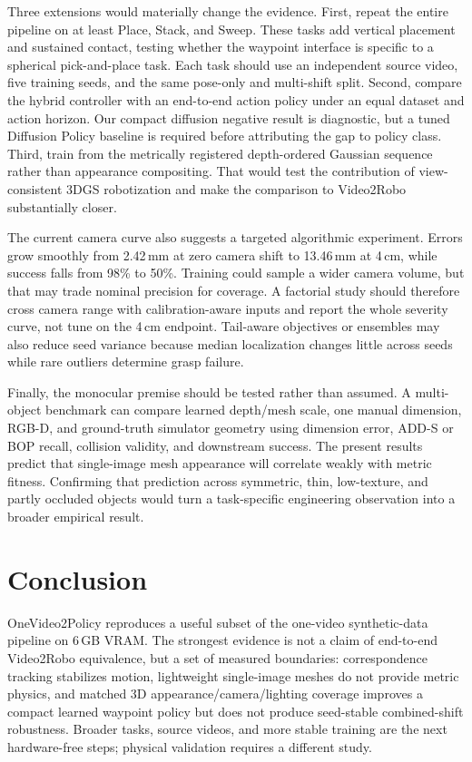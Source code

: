 \documentclass[10pt,twocolumn,letterpaper]{article}
\begin{document}
Three extensions would materially change the evidence. First, repeat the entire
pipeline on at least Place, Stack, and Sweep. These tasks add vertical placement
and sustained contact, testing whether the waypoint interface is specific to a
spherical pick-and-place task. Each task should use an independent source video,
five training seeds, and the same pose-only and multi-shift split. Second, compare
the hybrid controller with an end-to-end action policy under an equal dataset and
action horizon. Our compact diffusion negative result is diagnostic, but a tuned
Diffusion Policy baseline is required before attributing the gap to policy class.
Third, train from the metrically registered depth-ordered Gaussian sequence rather
than appearance compositing. That would test the contribution of view-consistent
3DGS robotization and make the comparison to Video2Robo substantially closer.

The current camera curve also suggests a targeted algorithmic experiment. Errors
grow smoothly from 2.42\,mm at zero camera shift to 13.46\,mm at 4\,cm, while
success falls from 98\% to 50\%. Training could sample a wider camera volume, but
that may trade nominal precision for coverage. A factorial study should therefore
cross camera range with calibration-aware inputs and report the whole severity
curve, not tune on the 4\,cm endpoint. Tail-aware objectives or ensembles may also
reduce seed variance because median localization changes little across seeds while
rare outliers determine grasp failure.

Finally, the monocular premise should be tested rather than assumed. A multi-object
benchmark can compare learned depth/mesh scale, one manual dimension, RGB-D, and
ground-truth simulator geometry using dimension error, ADD-S or BOP recall,
collision validity, and downstream success. The present results predict that
single-image mesh appearance will correlate weakly with metric fitness. Confirming
that prediction across symmetric, thin, low-texture, and partly occluded objects
would turn a task-specific engineering observation into a broader empirical result.

\section{Conclusion}
OneVideo2Policy reproduces a useful subset of the one-video synthetic-data
pipeline on 6\,GB VRAM. The strongest evidence is not a claim of end-to-end
Video2Robo equivalence, but a set of measured boundaries: correspondence tracking
stabilizes motion, lightweight single-image meshes do not provide metric physics,
and matched 3D appearance/camera/lighting coverage improves a compact learned
waypoint policy but does not produce seed-stable combined-shift robustness.
Broader tasks, source videos, and more stable training are the next hardware-free
steps; physical validation requires a different study.

\balance
{\small


}
\end{document}
